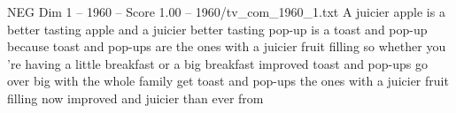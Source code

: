 \begin{textsample}{NEG Dim 1 – 1960 – Score 1.00 – 1960/tv\_com\_1960\_1.txt}  \label{ex:f1_neg_072}
A juicier apple is a better tasting apple and a juicier better tasting pop-up is a toast and pop-up because toast and pop-ups are the ones with a juicier fruit filling so whether you 're having a little breakfast or a big breakfast improved toast and pop-ups go over big with the whole family get toast and pop-ups the ones with a juicier fruit filling now improved and juicier than ever from

\end{textsample}
